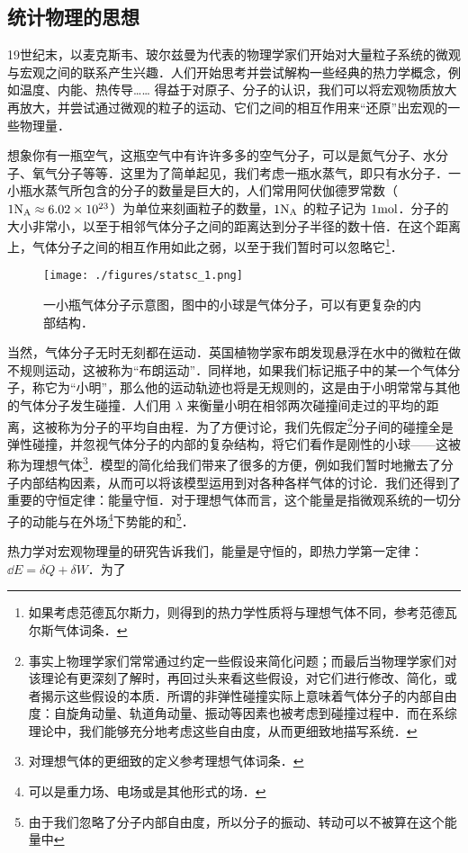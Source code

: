 \subsection{统计物理的思想}
19世纪末，以麦克斯韦、玻尔兹曼为代表的物理学家们开始对大量粒子系统的微观与宏观之间的联系产生兴趣．人们开始思考并尝试解构一些经典的热力学概念，例如温度、内能、热传导…… 得益于对原子、分子的认识，我们可以将宏观物质放大再放大，并尝试通过微观的粒子的运动、它们之间的相互作用来“还原”出宏观的一些物理量．

想象你有一瓶空气，这瓶空气中有许许多多的空气分子，可以是氮气分子、水分子、氧气分子等等．这里为了简单起见，我们考虑一瓶水蒸气，即只有水分子．一小瓶水蒸气所包含的分子的数量是巨大的，人们常用阿伏伽德罗常数（$1 {\rm N_A}\approx 6.02\times 10^{23}$）为单位来刻画粒子的数量，$1 {\rm N_A}$ 的粒子记为 $1 {\rm mol}$．分子的大小非常小，以至于相邻气体分子之间的距离达到分子半径的数十倍．在这个距离上，气体分子之间的相互作用如此之弱，以至于我们暂时可以忽略它\footnote{如果考虑范德瓦尔斯力，则得到的热力学性质将与理想气体不同，参考范德瓦尔斯气体词条．}．

\begin{figure}[ht]
\centering
\texttt{[image: ./figures/statsc\_1.png]}
\caption{一小瓶气体分子示意图，图中的小球是气体分子，可以有更复杂的内部结构．} \label{statsc_fig1}
\end{figure}
当然，气体分子无时无刻都在运动．英国植物学家布朗发现悬浮在水中的微粒在做不规则运动，这被称为“布朗运动”．同样地，如果我们标记瓶子中的某一个气体分子，称它为“小明”，那么他的运动轨迹也将是无规则的，这是由于小明常常与其他的气体分子发生碰撞．人们用 $\lambda$ 来衡量小明在相邻两次碰撞间走过的平均的距离，这被称为分子的平均自由程．为了方便讨论，我们先假定\footnote{事实上物理学家们常常通过约定一些假设来简化问题；而最后当物理学家们对该理论有更深刻了解时，再回过头来看这些假设，对它们进行修改、简化，或者揭示这些假设的本质．所谓的非弹性碰撞实际上意味着气体分子的内部自由度：自旋角动量、轨道角动量、振动等因素也被考虑到碰撞过程中．而在系综理论中，我们能够充分地考虑这些自由度，从而更细致地描写系统．}分子间的碰撞全是弹性碰撞，并忽视气体分子的内部的复杂结构，将它们看作是刚性的小球——这被称为理想气体\footnote{对理想气体的更细致的定义参考理想气体词条．}．模型的简化给我们带来了很多的方便，例如我们暂时地撇去了分子内部结构因素，从而可以将该模型运用到对各种各样气体的讨论．我们还得到了重要的守恒定律：能量守恒．对于理想气体而言，这个能量是指微观系统的一切分子的动能与在外场\footnote{可以是重力场、电场或是其他形式的场．}下势能的和\footnote{由于我们忽略了分子内部自由度，所以分子的振动、转动可以不被算在这个能量中}．

热力学对宏观物理量的研究告诉我们，能量是守恒的，即热力学第一定律：$\dd E=\delta Q+\delta W$．为了